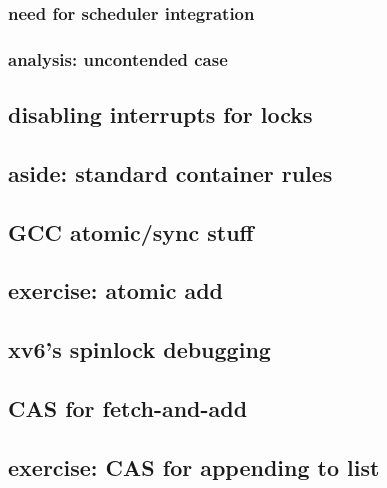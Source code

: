 \subsubsection{need for scheduler integration}


\subsubsection{analysis: uncontended case}



\subsection{disabling interrupts for locks}


%

\subsection{aside: standard container rules}


\subsection{GCC atomic/sync stuff}


\subsection{exercise: atomic add}

\subsection{xv6's spinlock debugging}



\subsection{CAS for fetch-and-add}


\subsection{exercise: CAS for appending to list}



